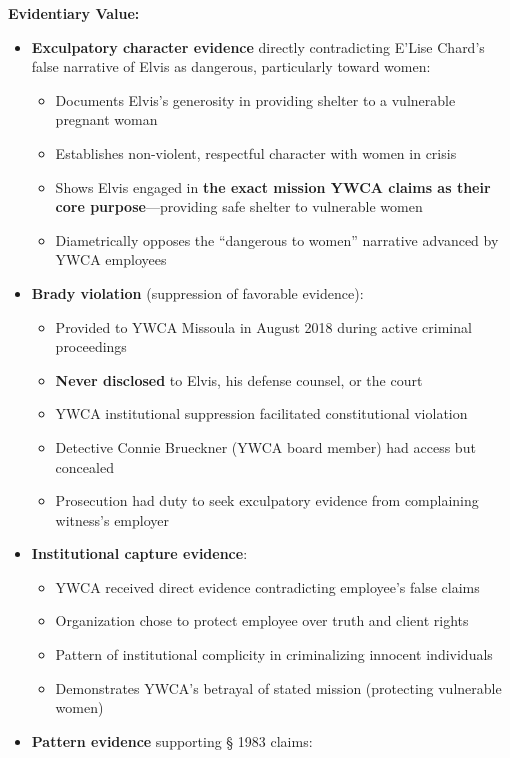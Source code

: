 \documentclass[11pt, letterpaper]{article}
\begin{document}
\textbf{Evidentiary Value:}

\begin{itemize}[leftmargin=*]
  \item \textbf{Exculpatory character evidence} directly contradicting E'Lise Chard's false narrative of Elvis as dangerous, particularly toward women:
    \begin{itemize}
      \item Documents Elvis's generosity in providing shelter to a vulnerable pregnant woman
      \item Establishes non-violent, respectful character with women in crisis
      \item Shows Elvis engaged in \textbf{the exact mission YWCA claims as their core purpose}---providing safe shelter to vulnerable women
      \item Diametrically opposes the ``dangerous to women'' narrative advanced by YWCA employees
    \end{itemize}
  \item \textbf{Brady violation} (suppression of favorable evidence):
    \begin{itemize}
      \item Provided to YWCA Missoula in August 2018 during active criminal proceedings
      \item \textbf{Never disclosed} to Elvis, his defense counsel, or the court
      \item YWCA institutional suppression facilitated constitutional violation
      \item Detective Connie Brueckner (YWCA board member) had access but concealed
      \item Prosecution had duty to seek exculpatory evidence from complaining witness's employer
    \end{itemize}
  \item \textbf{Institutional capture evidence}:
    \begin{itemize}
      \item YWCA received direct evidence contradicting employee's false claims
      \item Organization chose to protect employee over truth and client rights
      \item Pattern of institutional complicity in criminalizing innocent individuals
      \item Demonstrates YWCA's betrayal of stated mission (protecting vulnerable women)
    \end{itemize}
  \item \textbf{Pattern evidence} supporting \S{} 1983 claims:

\end{itemize}
\end{document}
